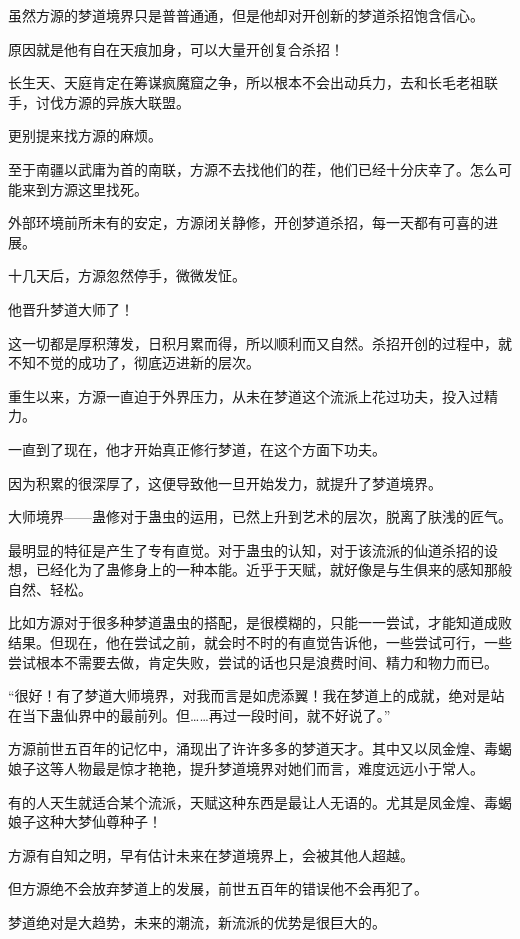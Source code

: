 \begin{this_body}
虽然方源的梦道境界只是普普通通，但是他却对开创新的梦道杀招饱含信心。

原因就是他有自在天痕加身，可以大量开创复合杀招！

长生天、天庭肯定在筹谋疯魔窟之争，所以根本不会出动兵力，去和长毛老祖联手，讨伐方源的异族大联盟。

更别提来找方源的麻烦。

至于南疆以武庸为首的南联，方源不去找他们的茬，他们已经十分庆幸了。怎么可能来到方源这里找死。

外部环境前所未有的安定，方源闭关静修，开创梦道杀招，每一天都有可喜的进展。

十几天后，方源忽然停手，微微发怔。

他晋升梦道大师了！

这一切都是厚积薄发，日积月累而得，所以顺利而又自然。杀招开创的过程中，就不知不觉的成功了，彻底迈进新的层次。

重生以来，方源一直迫于外界压力，从未在梦道这个流派上花过功夫，投入过精力。

一直到了现在，他才开始真正修行梦道，在这个方面下功夫。

因为积累的很深厚了，这便导致他一旦开始发力，就提升了梦道境界。

大师境界——蛊修对于蛊虫的运用，已然上升到艺术的层次，脱离了肤浅的匠气。

最明显的特征是产生了专有直觉。对于蛊虫的认知，对于该流派的仙道杀招的设想，已经化为了蛊修身上的一种本能。近乎于天赋，就好像是与生俱来的感知那般自然、轻松。

比如方源对于很多种梦道蛊虫的搭配，是很模糊的，只能一一尝试，才能知道成败结果。但现在，他在尝试之前，就会时不时的有直觉告诉他，一些尝试可行，一些尝试根本不需要去做，肯定失败，尝试的话也只是浪费时间、精力和物力而已。

“很好！有了梦道大师境界，对我而言是如虎添翼！我在梦道上的成就，绝对是站在当下蛊仙界中的最前列。但……再过一段时间，就不好说了。”

方源前世五百年的记忆中，涌现出了许许多多的梦道天才。其中又以凤金煌、毒蝎娘子这等人物最是惊才艳艳，提升梦道境界对她们而言，难度远远小于常人。

有的人天生就适合某个流派，天赋这种东西是最让人无语的。尤其是凤金煌、毒蝎娘子这种大梦仙尊种子！

方源有自知之明，早有估计未来在梦道境界上，会被其他人超越。

但方源绝不会放弃梦道上的发展，前世五百年的错误他不会再犯了。

梦道绝对是大趋势，未来的潮流，新流派的优势是很巨大的。


\end{this_body}
